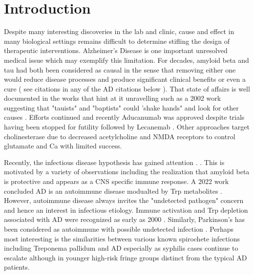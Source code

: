 \documentclass[aps,secnumarabic,balancelastpage,amsmath,amssymb,nofootinbib]{revtex4}
\begin{document}
\maketitle
\newpage
\tableofcontents
\newpage

\section{Introduction  }

Despite many interesting discoveries in the lab and clinic,
cause and effect in many biological settings remains difficult
to determine  stifling the design of therapeutic interventions.
Alzheimer's Disease is one important unresolved medical issue
which may exemplify this limitation. For decades, amyloid beta and tau
had both been considered as causal in the sense that removing
either one would reduce disease processes and produce
significant clinical benefits or even a cure
( see citations in any of the AD citations below ).  
That state of affairs is well documented 
in the works
that hint at it unravelling\cite{PMID37833948}  such as a 2002 work 
suggesting that  "tauists" and "baptists" could 'shake hands"
and look for other causes \cite{PMID11801334}. Efforts
continued and recently
Aducanumab was approved despite trials having been stopped for futility
\cite{PMC8491638}
followed by Lecanemab \cite{PMC10119064}
\cite{vanDyck_Swanson_Aisen_Lecanemab_Early_Alzheimer_2023}. 
Other approaches   target  cholinesterase  
 \cite{PMC4052996} 
due to decreased acetylcholine and NMDA receptors 
\cite{PMC6375899} to control  glutamate and Ca 
with limited success.

Recently, the infectious disease hypothesis has gained  
attention \cite{10.1371/journal.ppat.1010929}.
\cite{10.3389/fcimb.2023.1123228}
\cite{Lathe_Schultek_Balin_Establishment_consensus_2023}.
This is motivated by a variety of observations
including  the realization that amyloid
beta is protective and appears as a CNS specific immune response.
A 2022 work concluded AD is an autoimmune disease modualted 
by Trp metabolites  
\cite{DiezCecilia_Kolaj_Santos_Alzheimer_disease_2022}.
However, autoimmune disease always invites the "undetected
pathogen" concern and hence an interest in infectious etiology.
Immune activation and Trp depletion associated with AD were recognized
as early as 2000 \cite{Widner2000}.
Similarly, Parkinson's has been considered as autoimmune with 
possible undetected infection \cite{PMID37741513}.
Perhaps most interesting is the similarities between
various known spirochete infections including Treponema pallidum  and AD
\cite{PMC4399390} especially as  syphilis cases
continue to escalate although in younger high-risk fringe
groups
\cite{Amerson_CastilloValladares_Leslie_Resurgence_Syphilis_2022}
distinct from the typical AD patients.  
\end{document}
